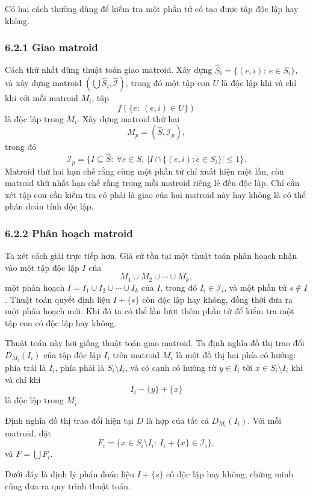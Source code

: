\documentclass[11pt]{article}
\begin{document}
Có hai cách thường dùng để kiểm tra một phần tử có tạo được tập độc lập hay
không.

\subsubsection*{6.2.1 Giao matroid}

Cách thứ nhất dùng thuật toán giao matroid. Xây dựng
\(\hat S_i=\{(e,i):\ e\in S_i\}\), và xây dựng matroid
\((\bigcup\hat S_i,\hat{\mathcal I})\), trong đó một tập con \(U\) là độc lập
khi và chỉ khi với mỗi matroid \(M_i\), tập
\[
  f(\{e:\ (e,i)\in U\})
\]
là độc lập trong \(M_i\). Xây dựng matroid thứ hai
\[
  M_p=(\hat S,\mathcal I_p),
\]
trong đó
\[
  \mathcal I_p=\{I\subseteq\hat S:\ \forall e\in S,\ |I\cap\{(e,i):e\in S_i\}|\le 1\}.
\]
Matroid thứ hai hạn chế rằng cùng một phần tử chỉ xuất hiện một lần, còn matroid
thứ nhất hạn chế rằng trong mỗi matroid riêng lẻ đều độc lập. Chỉ cần xét tập
con cần kiểm tra có phải là giao của hai matroid này hay không là có thể phán
đoán tính độc lập.

\subsubsection*{6.2.2 Phân hoạch matroid}

Ta xét cách giải trực tiếp hơn. Giả sử tồn tại một thuật toán phân hoạch nhận
vào một tập độc lập \(I\) của
\[
  M_1\cup M_2\cup\cdots\cup M_k,
\]
một phân hoạch \(I=I_1\cup I_2\cup\cdots\cup I_k\) của \(I\), trong đó
\(I_i\in\mathcal I_i\), và một phần tử \(s\notin I\). Thuật toán quyết định liệu
\(I+\{s\}\) còn độc lập hay không, đồng thời đưa ra một phân hoạch mới. Khi đó
ta có thể lần lượt thêm phần tử để kiểm tra một tập con có độc lập hay không.

Thuật toán này hơi giống thuật toán giao matroid. Ta định nghĩa đồ thị trao đổi
\(D_{M_i}(I_i)\) của tập độc lập \(I_i\) trên matroid \(M_i\) là một đồ thị hai
phía có hướng: phía trái là \(I_i\), phía phải là \(S_i\setminus I_i\), và có
cạnh có hướng từ \(y\in I_i\) tới \(x\in S_i\setminus I_i\) khi và chỉ khi
\[
  I_i-\{y\}+\{x\}
\]
là độc lập trong \(M_i\).

Định nghĩa đồ thị trao đổi hiện tại \(D\) là hợp của tất cả \(D_{M_i}(I_i)\).
Với mỗi matroid, đặt
\[
  F_i=\{x\in S_i\setminus I_i:\ I_i+\{x\}\in\mathcal I_i\},
\]
và \(F=\bigcup F_i\).

Dưới đây là định lý phán đoán liệu \(I+\{s\}\) có độc lập hay không; chứng minh
cũng đưa ra quy trình thuật toán.
\end{document}
